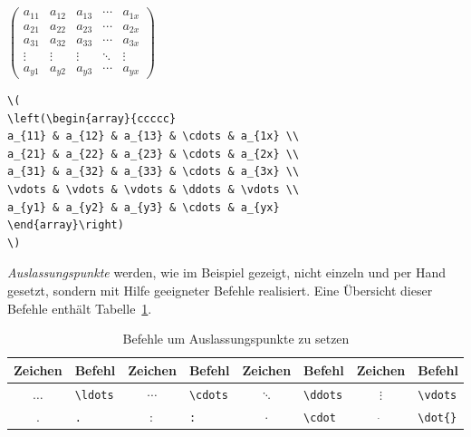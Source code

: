 \documentclass[a4paper,10pt,twoside]{scrbook}
\begin{document}
\begin{minipage}[c]{.38\textwidth}
\setlength{\parskip}{1em}
\centering
\(
\left(\begin{array}{ccccc}
a_{11} & a_{12} & a_{13} & \cdots & a_{1x} \\ 
a_{21} & a_{22} & a_{23} & \cdots & a_{2x} \\ 
a_{31} & a_{32} & a_{33} & \cdots & a_{3x} \\ 
\vdots & \vdots & \vdots & \ddots & \vdots \\
a_{y1} & a_{y2} & a_{y3} & \cdots & a_{yx}
\end{array}\right)
\)
\end{minipage}
\hfill
\begin{minipage}[c]{.6\textwidth}
\setlength{\parskip}{1em}
\begin{lstlisting}[label=arraybeispiel, style=customlatex]
\(
\left(\begin{array}{ccccc}
a_{11} & a_{12} & a_{13} & \cdots & a_{1x} \\ 
a_{21} & a_{22} & a_{23} & \cdots & a_{2x} \\ 
a_{31} & a_{32} & a_{33} & \cdots & a_{3x} \\ 
\vdots & \vdots & \vdots & \ddots & \vdots \\
a_{y1} & a_{y2} & a_{y3} & \cdots & a_{yx}
\end{array}\right)
\)
\end{lstlisting}
\end{minipage}

\textsl{Auslassungspunkte} werden, wie im Beispiel gezeigt, 
nicht einzeln und per Hand gesetzt, sondern mit Hilfe geeigneter Befehle realisiert.
Eine Übersicht dieser Befehle enthält Tabelle~\ref{Tabelle_Befehle}.


\begin{table}[h!tb]
\centering
\caption{Befehle um Auslassungspunkte zu setzen}
\label{Tabelle_Befehle}       %
\begin{tabular}{clclclcl}
\hline
Zeichen & Befehl & Zeichen & Befehl & Zeichen & Befehl & Zeichen & Befehl \\
\hline
$\ldots$ & \texttt{\textbackslash ldots} & 
$\cdots$ & \texttt{\textbackslash cdots} &
$\ddots$ & \texttt{\textbackslash ddots} &
$\vdots$ & \texttt{\textbackslash vdots} \\
$.$ & \texttt{.} &
$:$ & \texttt{:} &
$\cdot$ & \texttt{\textbackslash cdot} &
$\dot{}$ & \texttt{\textbackslash dot\{\}} \\
\hline
\end{tabular}
\end{table}
\end{document}
